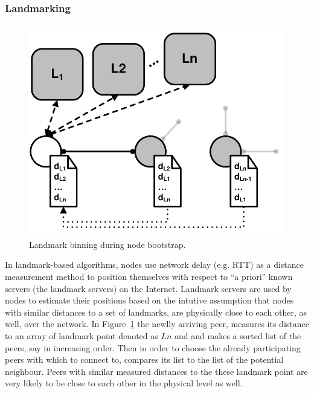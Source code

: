 \subsubsection{Landmarking}\label{sec:landmark}

\begin{figure}[ht]
\centering
  \includegraphics[scale=0.4]{img/pdf/landmarking.pdf}
\caption{Landmark binning during node bootstrap.}
\label{figure:landmarking}
\end{figure}

In landmark-based algorithms, nodes use network delay (e.g. RTT) as a
distance measurement method to position themselves with respect to ``a priori''
known servers (the landmark servers) on the Internet. Landmark servers are used
by nodes to estimate their positions based on the intutive assumption that nodes
with similar distances to a set of landmarks, are physically close to each
other, as well, over the network. In Figure~\ref{figure:landmarking} the newlly
arriving peer, measures its distance to an array of landmark point denoted as
$Ln$ and and makes a sorted list of the peers, say in increasing order. Then in
order to choose the already participating peers with which to connect to,
compares its list to the list of the potential neighbour. Peers with similar
measured distances to the these landmark point are very likely to be close to
each other in the physical level as well.

